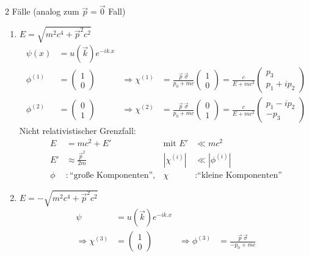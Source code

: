 2 Fälle (analog zum $\vec{p}= \vec{0}$ Fall)
	\begin{enumerate}[1.]
		\item $E= \sqrt{m^2c^4 + \vec{p}^2 c^2}$
		\begin{align*}
			\psi (x) &= u(\vec{k}) e^{-ik.x} \\
			\phi^{(1)} &= 
			\begin{pmatrix}
			1 \\ 0
			\end{pmatrix}
			&\Rightarrow 
			\chi^{(1)} &= \frac{\vec{p}~\vec{\sigma}}{p_0 + mc}
			\begin{pmatrix}
			1 \\ 0
			\end{pmatrix}
			= \frac{c}{E + mc^2}
			\begin{pmatrix}
			p_3 \\ p_1 + ip_2
			\end{pmatrix} 
			\\
			\phi^{(2)} &= 
			\begin{pmatrix}
			0 \\ 1
			\end{pmatrix}
			&\Rightarrow 
			\chi^{(2)} &= \frac{\vec{p}~\vec{\sigma}}{p_0 + mc}
			\begin{pmatrix}
			0 \\ 1
			\end{pmatrix}
			= \frac{c}{E + mc^2}
			\begin{pmatrix}
			p_1 - ip_2 \\ -p_3
			\end{pmatrix}
		\end{align*}
	Nicht relativistischer Grenzfall:
		\begin{align*}
			E &= mc^2 + E' &\text{mit } E' &\ll mc^2 \\
			E' &\approx \frac{\vec{p}^2}{2m} &
			\left|\chi^{(i)} \right| &\ll \left|\phi^{(i)} \right| \\
			\phi &: \text{``große Komponenten''} ,& \chi &: \text{``kleine Komponenten''}
		\end{align*}
	\item $E=-\sqrt{m^2c^4 + \vec{p}^2 c^2}$
		\begin{align*}
			\psi &= u(\vec{k}) e^{-ik.x} \\
			\Rightarrow 
			\chi^{(3)} &= 
			\begin{pmatrix}
			1 \\ 0
			\end{pmatrix}
			&\Rightarrow 
			\phi^{(3)} &= \frac{\vec{p}~\vec{\sigma}}{-p_0 + mc}

\end{align*}
\end{enumerate}
